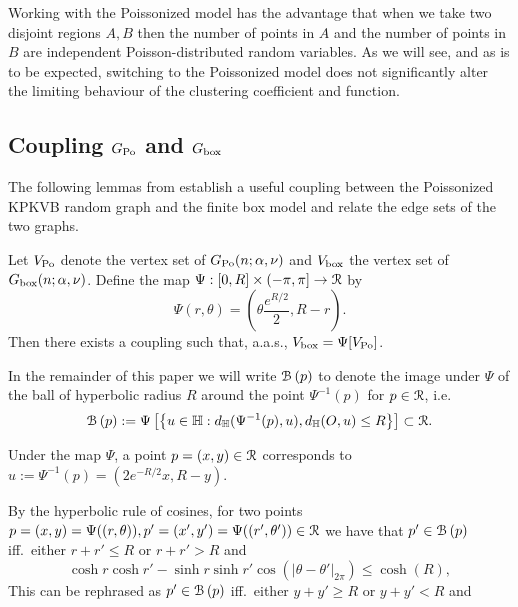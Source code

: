 Working with the Poissonized model has the advantage that when we take two disjoint regions $A, B$ then the number of points in $A$ and the number of points  in $B$ are independent Poisson-distributed random variables. As we will see, and as is to be expected, switching to the Poissonized model does not significantly alter the limiting behaviour of the clustering coefficient and function.


\subsection{Coupling \texorpdfstring{$G_{{\mathrm{Po}}}$}{G Po} and \texorpdfstring{$G_{\mathrm{box}}$}{G box}\label{ssec:coupling_H_P}}


The following lemmas from \cite{fountoulakis2018law} establish a useful coupling between the Poissonized KPKVB random graph
and the finite box model and relate the edge  sets of the two graphs. 

\begin{lemma}\label{lem:coupling_hyperbolic_poisson}
Let $V_{{\mathrm{Po}}}$ denote the vertex set of $G_{{\mathrm{Po}}}(n;\alpha, \nu)$ and $V_{\text{box}}$ the vertex set of $G_{\mathrm{box}}(n;\alpha, \nu)$. 
Define the map $\Psi : [0,R] \times (-\pi, \pi] \to {\mathcal R}$ by
\begin{equation}\label{eq:def_Psi}
	\Psi(r,\theta) = \left(\theta \frac{e^{R/2}}{2}, R - r\right).
\end{equation}
Then there exists a coupling such that, a.a.s., $V_{\text{box}} = \Psi[V_{{\mathrm{Po}}}]$. %
\end{lemma}

In the remainder of this paper we will write ${\mathcal B}\left(p\right)$ to denote the image under $\Psi$ of the ball of hyperbolic radius $R$ around the point 
$\Psi^{-1}(p)$ for $p \in {\mathcal R}$, i.e. 
\[
	{\mathcal B}\left(p\right) := 
	\Psi\left[ \left\{ u \in {\mathbb H} : 
	d_{\mathbb{H}}(\Psi^{-1}(p),u), d_{\mathbb{H}}(O,u) \le R \right\}\right] \subset {\mathcal R}.
\]

Under the map $\Psi$, a point $p = (x,y) \in {\mathcal R}$ corresponds to $u := \Psi^{-1}(p) = (2 e^{-R/2} x, R - y)$. 

By the hyperbolic rule of cosines, for two points $p = (x,y) = \Psi( (r,\theta) ), p' = (x',y') = \Psi( (r',\theta') ) \in {\mathcal R}$ we have that $p' \in {\mathcal B}\left(p\right)$ iff.~either $r+r'\leq R$ or $r+r'>R$ and
\[
	\cosh r \cosh r' - \sinh r \sinh r'\cos\left( |\theta-\theta'|_{2\pi} \right) \le \cosh(R),
\]
This can be rephrased as $p'\in {\mathcal B}\left(p\right)$ iff.~either $y+y'\geq R$ or $y+y'<R$ and 


